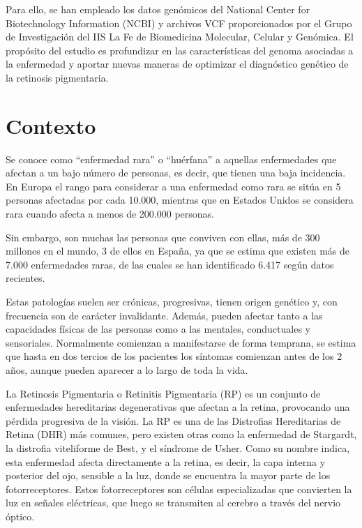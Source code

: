 \documentclass[11pt,spanish,listoffigures,listoftables]{tfgetsinf}
\begin{document}
 

Para ello, se han empleado los datos genómicos del National Center for Biotechnology Information (NCBI) y archivos VCF proporcionados por el Grupo de Investigación del IIS La Fe de Biomedicina Molecular, Celular y Genómica. El propósito del estudio es profundizar en las características del genoma asociadas a la enfermedad y aportar nuevas maneras de optimizar el diagnóstico genético de la retinosis pigmentaria. 

\section{Contexto}

Se conoce como “enfermedad rara” o “huérfana” a aquellas enfermedades que afectan a un bajo número de personas, es decir, que tienen una baja incidencia. En Europa el rango para considerar a una enfermedad como rara se sitúa en 5 personas afectadas por cada 10.000, mientras que en Estados Unidos se considera rara cuando afecta a menos de 200.000 personas\cite{ENF}.

Sin embargo, son muchas las personas que conviven con ellas, más de 300 millones en el mundo, 3 de ellos en España, ya que se estima que existen más de 7.000 enfermedades raras, de las cuales se han identificado 6.417 según datos recientes\cite{CON}.

Estas patologías suelen ser crónicas, progresivas, tienen origen genético y, con frecuencia son de carácter invalidante. Además, pueden afectar tanto a las capacidades físicas de las personas como a las mentales, conductuales y sensoriales. Normalmente comienzan a manifestarse de forma temprana, se estima que hasta en dos tercios de los pacientes los síntomas comienzan antes de los 2 años, aunque pueden aparecer a lo largo de toda la vida. 

La Retinosis Pigmentaria o Retinitis Pigmentaria (RP) es un conjunto de enfermedades hereditarias degenerativas que afectan a la retina, provocando una pérdida progresiva de la visión. La RP es una de las Distrofias Hereditarias de Retina (DHR) más comunes, pero existen otras como la enfermedad de Stargardt, la distrofia viteliforme de Best, y el síndrome de Usher. Como su nombre indica, esta enfermedad afecta directamente a la retina, es decir, la capa interna y posterior del ojo, sensible a la luz, donde se encuentra la mayor parte de los fotorreceptores. Estos fotorreceptores son células especializadas que convierten la luz en señales eléctricas, que luego se transmiten al cerebro a través del nervio óptico\cite{GAR}.
\end{document}
